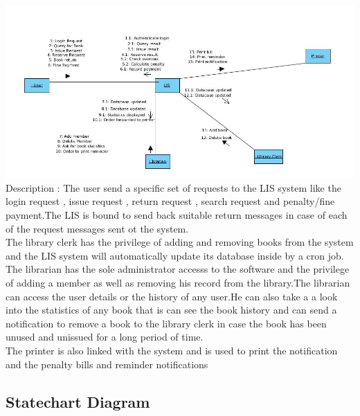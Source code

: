 \documentclass[a4paper]{article}
\begin{document}
\includegraphics[scale=0.50]{images/collaDiag.jpg}
\\
Description : The user send a specific set of requests to the LIS system like the login request , issue request , return request , search request and penalty/fine payment.The LIS is bound to send back suitable return messages in case of each of the request messages sent ot the system.
\\
The library clerk has the privilege of adding and removing books from the system and the LIS system will automatically update its database inside by a cron job.
\\
The librarian has the sole administrator accesss to the software and the privilege of adding a member as well as removing his record from the library.The librarian can access the user details or the history of any user.He can also take a a look into the statistics of any book that is can see the book history and can send a notification to remove a book to the library clerk in case the book has been unused and unissued for a long period of time.
\\
The printer is also linked with the system and is used to print the notification and the penalty bills and reminder notifications

\subsection{Statechart Diagram}
\end{document}
